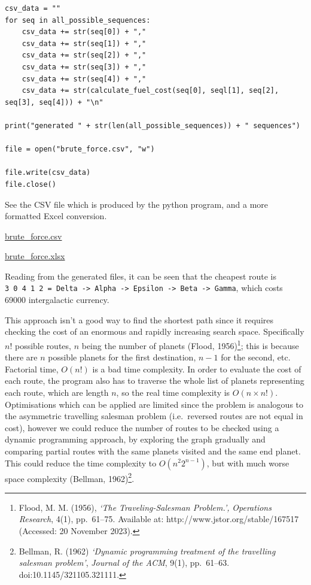 \documentclass[
]{article}
\begin{document}
\begin{verbatim}
csv_data = ""
for seq in all_possible_sequences:
    csv_data += str(seq[0]) + ","
    csv_data += str(seq[1]) + ","
    csv_data += str(seq[2]) + ","
    csv_data += str(seq[3]) + ","
    csv_data += str(seq[4]) + ","
    csv_data += str(calculate_fuel_cost(seq[0], seql[1], seq[2], seq[3], seq[4])) + "\n"

print("generated " + str(len(all_possible_sequences)) + " sequences")

file = open("brute_force.csv", "w")

file.write(csv_data)
file.close()
\end{verbatim}

See the CSV file which is produced by the python program, and a more
formatted Excel conversion.

\url{brute_force.csv}

\url{brute_force.xlsx}

Reading from the generated files, it can be seen that the cheapest route
is
\texttt{3\ 0\ 4\ 1\ 2\ =\ Delta\ -\textgreater{}\ Alpha\ -\textgreater{}\ Epsilon\ -\textgreater{}\ Beta\ -\textgreater{}\ Gamma},
which costs 69000 intergalactic currency.

This approach isn't a good way to find the shortest path since it
requires checking the cost of an enormous and rapidly increasing search
space. Specifically \(n!\) possible routes, \(n\) being the number of
planets (Flood, 1956)\footnote{Flood, M. M. (1956), \emph{`The
  Traveling-Salesman Problem.',} \emph{Operations Research}, 4(1),
  pp.~61--75. Available at: http://www.jstor.org/stable/167517
  (Accessed: 20 November 2023).}; this is because there are \(n\)
possible planets for the first destination, \(n-1\) for the second, etc.
Factorial time, \(O(n!)\) is a bad time complexity. In order to evaluate
the cost of each route, the program also has to traverse the whole list
of planets representing each route, which are length \(n\), so the real
time complexity is \(O(n\times n!)\). Optimisations which can be applied
are limited since the problem is analogous to the asymmetric travelling
salesman problem (i.e.~reversed routes are not equal in cost), however
we could reduce the number of routes to be checked using a dynamic
programming approach, by exploring the graph gradually and comparing
partial routes with the same planets visited and the same end planet.
This could reduce the time complexity to \(O(n^2 2^{n-1})\), but with
much worse space complexity (Bellman, 1962)\footnote{Bellman, R. (1962)
  \emph{`Dynamic programming treatment of the travelling salesman
  problem'}, \emph{Journal of the ACM}, 9(1), pp.~61--63.
  doi:10.1145/321105.321111.}.
\end{document}
